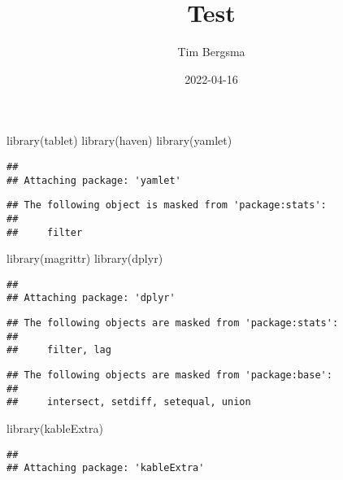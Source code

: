 \documentclass[
]{article}
\title{Test}
\author{Tim Bergsma}
\date{2022-04-16}
\newenvironment{Shaded}{\begin{snugshade}}{\end{snugshade}}
\newcommand{\FunctionTok}[1]{\textcolor[rgb]{0.00,0.00,0.00}{#1}}
\newcommand{\NormalTok}[1]{#1}
\begin{document}
\maketitle

{
\setcounter{tocdepth}{2}
\tableofcontents
}
\begin{Shaded}
\begin{Highlighting}[]
\FunctionTok{library}\NormalTok{(tablet)}
\FunctionTok{library}\NormalTok{(haven)}
\FunctionTok{library}\NormalTok{(yamlet)}
\end{Highlighting}
\end{Shaded}

\begin{verbatim}
## 
## Attaching package: 'yamlet'
\end{verbatim}

\begin{verbatim}
## The following object is masked from 'package:stats':
## 
##     filter
\end{verbatim}

\begin{Shaded}
\begin{Highlighting}[]
\FunctionTok{library}\NormalTok{(magrittr)}
\FunctionTok{library}\NormalTok{(dplyr)}
\end{Highlighting}
\end{Shaded}

\begin{verbatim}
## 
## Attaching package: 'dplyr'
\end{verbatim}

\begin{verbatim}
## The following objects are masked from 'package:stats':
## 
##     filter, lag
\end{verbatim}

\begin{verbatim}
## The following objects are masked from 'package:base':
## 
##     intersect, setdiff, setequal, union
\end{verbatim}

\begin{Shaded}
\begin{Highlighting}[]
\FunctionTok{library}\NormalTok{(kableExtra)}
\end{Highlighting}
\end{Shaded}

\begin{verbatim}
## 
## Attaching package: 'kableExtra'
\end{verbatim}
\end{document}
